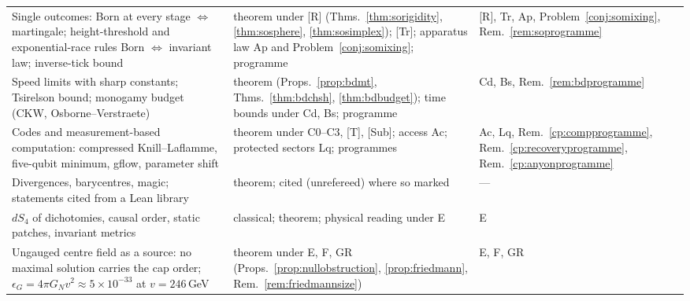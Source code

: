 \documentclass[aps,pra,onecolumn,superscriptaddress,nofootinbib,10pt]{revtex4-2}
\theoremstyle{definition}
\theoremstyle{remark}
\begin{document}
\begin{table}[p]
\begin{tabular}{@{}p{}p{}p{}@{}}
{Single outcomes: Born at every stage $\Leftrightarrow$ martingale; height-threshold and exponential-race rules Born $\Leftrightarrow$ invariant law; inverse-tick bound} & theorem under [R] (Thms.~\ref{thm:sorigidity}, \ref{thm:sosphere}, \ref{thm:sosimplex}); [Tr]; apparatus law Ap and Problem~\ref{conj:somixing}; programme & [R], Tr, Ap, Problem~\ref{conj:somixing}, Rem.~\ref{rem:soprogramme}\\
{Speed limits with sharp constants; Tsirelson bound; monogamy budget (CKW, Osborne--Verstraete)} & theorem (Props.~\ref{prop:bdmt}, Thms.~\ref{thm:bdchsh}, \ref{thm:bdbudget}); time bounds under Cd, Bs; programme & Cd, Bs, Rem.~\ref{rem:bdprogramme}\\
{Codes and measurement-based computation: compressed Knill--Laflamme, five-qubit minimum, gflow, parameter shift} & theorem under C0--C3, [T], [Sub]; access Ac; protected sectors Lq; programmes & Ac, Lq, Rem.~\ref{cp:compprogramme}, Rem.~\ref{cp:recoveryprogramme}, Rem.~\ref{cp:anyonprogramme}\\
{Divergences, barycentres, magic; statements cited from a Lean library} & theorem; cited (unrefereed) where so marked & ---\\
{$dS_4$ of dichotomies, causal order, static patches, invariant metrics} & classical; theorem; physical reading under E & E\\
{Ungauged centre field as a source: no maximal solution carries the cap order; $\epsilon_G=4\pi G_Nv^2\approx5\times10^{-33}$ at $v=246$\,GeV} & theorem under E, F, GR (Props.~\ref{prop:nullobstruction}, \ref{prop:friedmann}, Rem.~\ref{rem:friedmannsize}) & E, F, GR\\
\bottomrule
\end{tabular}
\end{table}
\end{document}
